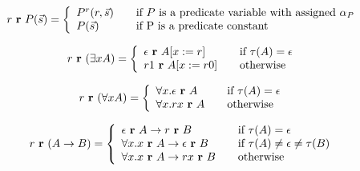 \[ r \ \textbf{r} \ P(\vec{s}) = \left\{ 
\begin{array}{l l}
P^r(r,\vec{s}) & \quad \text{if $P$ is a predicate variable with assigned $\alpha_P$} \\ 
P(\vec{s}) & \quad \text{if P is a predicate constant} \\

\end{array} \right.
\]

\[ r \ \textbf{r} \ (\exists x A) = \left\{ 
\begin{array}{l l}
\epsilon \ \textbf{r} \ A[x:=r] & \quad \text{if $\tau (A) = \epsilon$} \\ 
r1 \ \textbf{r} \ A[x:= r0] & \quad \text{otherwise} \\

\end{array} \right.
\]

\[ r \ \textbf{r} \ (\forall x A) = \left\{ 
\begin{array}{l l}
\forall x. \epsilon \ \textbf{r} \ A & \quad \text{if $\tau (A) = \epsilon$} \\ 
\forall x. rx \ \textbf{r} \ A & \quad \text{otherwise} \\

\end{array} \right.
\]

\[ r \ \textbf{r} \ (A \to B) = \left\{ 
\begin{array}{l l}
\epsilon \ \textbf{r} \ A \to r \ \textbf{r} \ B & \quad \text{if $\tau (A) = \epsilon$} \\ 
\forall x.x \ \textbf{r} \ A \to \epsilon \ \textbf{r} \ B & \quad \text{if
  $\tau (A) \neq \epsilon \neq \tau (B)$} \\
\forall x. x \ \textbf{r} \ A \to r x  \ \textbf{r} \ B & \quad \text{otherwise} \\

\end{array} \right.
\]





